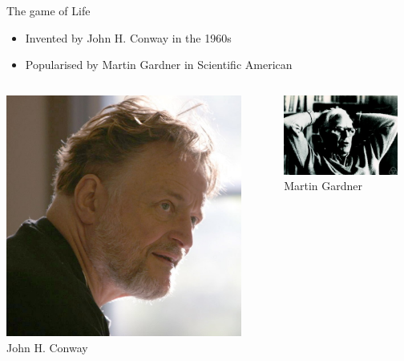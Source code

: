 \documentclass{beamer}
\begin{document}
\begin{frame}{The game of Life}
	\begin{itemize}
		\item Invented by John H. Conway in the 1960s
		\item Popularised by Martin Gardner in Scientific American
	\end{itemize}

	\begin{columns}[onlytextwidth]
	\begin{column}{0.5\textwidth}
		\centering
		\includegraphics[width=0.9\textwidth]{conway} \\
		John H. Conway
	\end{column}

	\begin{column}{0.5\textwidth}
		\centering
		\includegraphics[width=0.9\textwidth]{gardner} \\
		Martin Gardner
	\end{column}
	\end{columns}
\end{frame}
\end{document}
